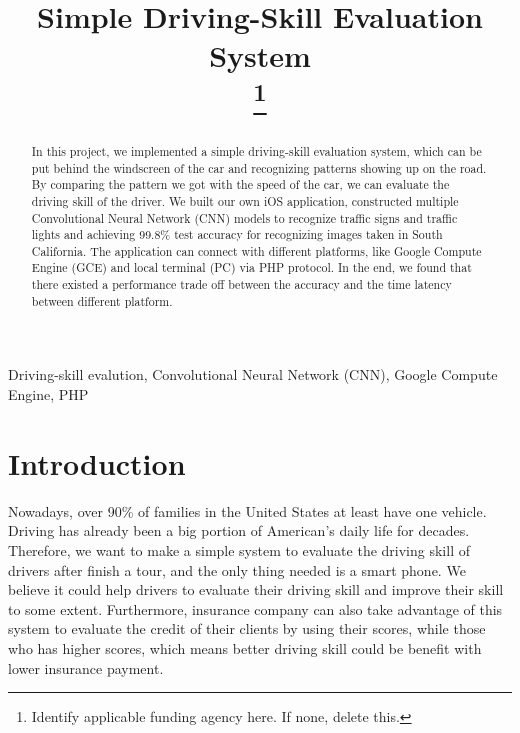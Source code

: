\documentclass[conference]{IEEEtran}
\begin{document}
\title{Simple Driving-Skill Evaluation System\\
\thanks{Identify applicable funding agency here. If none, delete this.}
}

\author{
\and
{}
}

\maketitle

\begin{abstract}
In this project, we implemented a simple driving-skill evaluation system, which can be put behind the windscreen of the car and recognizing patterns showing up on the road. By  comparing the pattern we got with the speed of the car, we can evaluate the driving skill of the driver. We built our own iOS application, constructed multiple Convolutional Neural Network (CNN) models to recognize traffic signs and traffic lights and achieving 99.8\% test accuracy for recognizing images taken in South California. The application can connect with different platforms, like Google Compute Engine (GCE) and local terminal (PC) via PHP protocol. In the end, we found that there existed a performance trade off between the accuracy and the time latency between different platform.
\end{abstract}

\begin{IEEEkeywords}
Driving-skill evalution, Convolutional Neural Network (CNN),  Google Compute Engine, PHP
\end{IEEEkeywords}

\section{Introduction}
Nowadays, over 90\% of families in the United States at least have one vehicle. Driving has already been a big portion of American's daily life for decades. Therefore, we want to make a simple system to evaluate the driving skill of drivers after finish a tour, and the only thing needed is a smart phone. We believe it could help drivers to evaluate their driving skill and improve their skill to some extent. Furthermore, insurance company can also take advantage of this system to evaluate the credit of their clients by using their scores, while those who has higher scores, which means better driving skill could be benefit with lower insurance payment.
\end{document}

